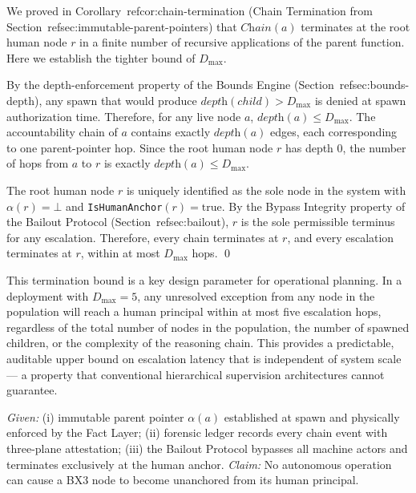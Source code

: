 \begin{Proof}
\begin{Proof}
We proved in Corollary~ref{cor:chain-termination} (Chain Termination from Section~ref{sec:immutable-parent-pointers}) that $\textit{Chain}(a)$ terminates at the root human node $r$ in a finite number of recursive applications of the parent function. Here we establish the tighter bound of $D_{\max}$.

By the depth-enforcement property of the Bounds Engine (Section~ref{sec:bounds-depth}), any spawn that would produce $\textit{depth}(child) > D_{\max}$ is denied at spawn authorization time. Therefore, for any live node $a$, $\textit{depth}(a) \leq D_{\max}$. The accountability chain of $a$ contains exactly $\textit{depth}(a)$ edges, each corresponding to one parent-pointer hop. Since the root human node $r$ has depth $0$, the number of hops from $a$ to $r$ is exactly $\textit{depth}(a) \leq D_{\max}$.

The root human node $r$ is uniquely identified as the sole node in the system with $\alpha(r) = \bot$ and \texttt{IsHumanAnchor}$(r) = \text{true}$. By the Bypass Integrity property of the Bailout Protocol (Section~ref{sec:bailout}), $r$ is the sole permissible terminus for any escalation. Therefore, every chain terminates at $r$, and every escalation terminates at $r$, within at most $D_{\max}$ hops. \qed
\end{Proof}

This termination bound is a key design parameter for operational planning. In a deployment with $D_{\max} = 5$, any unresolved exception from any node in the population will reach a human principal within at most five escalation hops, regardless of the total number of nodes in the population, the number of spawned children, or the complexity of the reasoning chain. This provides a predictable, auditable upper bound on escalation latency that is independent of system scale — a property that conventional hierarchical supervision architectures cannot guarantee.

\begin{ theorem }
\label{th:drift-sketch}
\textit{Given:} (i) immutable parent pointer $\alpha(a)$ established at spawn and physically enforced by the Fact Layer; (ii) forensic ledger records every chain event with three-plane attestation; (iii) the Bailout Protocol bypasses all machine actors and terminates exclusively at the human anchor. \textit{Claim:} No autonomous operation can cause a BX3 node to become unanchored from its human principal.


\end{ theorem }
\end{Proof}
